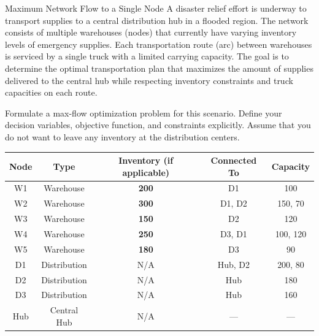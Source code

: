 \begin{ex}{Maximum Network Flow to a Single Node}{}
\label{ex:relief-max-flow}
 A disaster relief effort is underway to transport supplies to a central distribution hub in a flooded region. The network consists of multiple warehouses (nodes) that currently have varying inventory levels of emergency supplies. Each transportation route (arc) between warehouses is serviced by a single truck with a limited carrying capacity. The goal is to determine the optimal transportation plan that maximizes the amount of supplies delivered to the central hub while respecting inventory constraints and truck capacities on each route.

Formulate a max-flow optimization problem for this scenario. Define your decision variables, objective function, and constraints explicitly.  Assume that you do not want to leave any inventory at the distribution centers.

    \begin{tabular}{|c|c|c|c|c|}
        \hline
        \textbf{Node} & \textbf{Type} & \textbf{Inventory (if applicable)} & \textbf{Connected To} & \textbf{Capacity} \\
        \hline
        W1 & Warehouse & \textbf{200} & D1 & 100 \\
        W2 & Warehouse & \textbf{300} & D1, D2 & 150, 70 \\
        W3 & Warehouse & \textbf{150} & D2 & 120 \\
        W4 & Warehouse & \textbf{250} & D3, D1 & 100, 120 \\
        W5 & Warehouse & \textbf{180} & D3 & 90 \\
        \hline
        D1 & Distribution  & N/A & Hub, D2 & 200, 80 \\
        D2 & Distribution & N/A & Hub & 180 \\
        D3 & Distribution & N/A & Hub & 160 \\
        \hline
        Hub & Central Hub & N/A & --- & --- \\
        \hline
    \end{tabular}
\par{}\label{tab:modeling-sums-continued-tab04}%

    
\begin{center}
\begin{tikzpicture}[
    node distance=1.5cm and 2.5cm,
    warehouse/.style={draw, rectangle, minimum size=1.2cm, font=\small},
    distribution/.style={draw, circle, minimum size=1.2cm, font=\small},
    hub/.style={draw,  diamond, minimum size=1.2cm, font=\small}]


\end{tikzpicture}
\end{center}
\end{ex}
